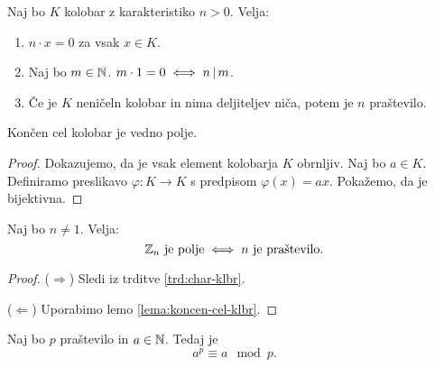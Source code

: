 \begin{trditev}
    \label{trd:char-klbr}
    Naj bo $K$ kolobar z karakteristiko $n > 0$. Velja:
    \begin{enumerate}
        \item $n \cdot x = 0$ za vsak $x \in K$.
        \item Naj bo $m \in \mathbb{N}$. $m \cdot 1 = 0 \iff n \, |  \, m$.
        \item Če je $K$ neničeln kolobar in nima deljiteljev niča, potem je $n$ praštevilo.
    \end{enumerate}
\end{trditev}

\begin{lema}
    \label{lema:koncen-cel-klbr}
    Končen cel kolobar je vedno polje.
\end{lema}

\begin{proof}
    Dokazujemo, da je vsak element kolobarja \(K\) obrnljiv. Naj bo \(a \in K\). Definiramo preslikavo \(\varphi: K \to K\) s predpisom \(\varphi(x) = ax\). Pokažemo, da je bijektivna.
\end{proof}

\begin{trditev}
    Naj bo \(n \neq 1\). Velja:
    \[\Z_n \ \text{je polje} \liff n \ \text{je praštevilo}.\]
\end{trditev}

\begin{proof}
    (\(\Rightarrow\)) Sledi iz trditve \ref{trd:char-klbr}.

    (\(\Leftarrow\)) Uporabimo lemo \ref{lema:koncen-cel-klbr}.
\end{proof}

\begin{izrek}
    Naj bo \(p\) praštevilo in \(a \in \mathbb{N}\). Tedaj je \[a^p \equiv a \mod p.\]
\end{izrek}